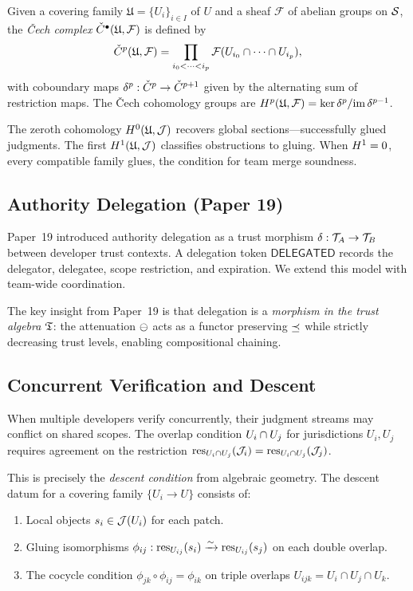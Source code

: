 \documentclass[11pt]{article}
\newcommand{\DelegToken}{\mathsf{DELEGATED}}
\begin{document}
\begin{definition}
Given a covering family $\mathfrak{U} = \{U_i\}_{i \in I}$ of $U$ and a sheaf
$\mathcal{F}$ of abelian groups on $\mathcal{S}$, the \emph{\v{C}ech complex}
$\check{C}^\bullet(\mathfrak{U}, \mathcal{F})$ is defined by
\[
  \check{C}^p(\mathfrak{U}, \mathcal{F}) =
  \prod_{i_0 < \cdots < i_p} \mathcal{F}(U_{i_0} \cap \cdots \cap U_{i_p}),
\]
with coboundary maps $\delta^p : \check{C}^p \to \check{C}^{p+1}$ given by the
alternating sum of restriction maps. The \v{C}ech cohomology groups are
$H^{p}(\mathfrak{U}, \mathcal{F}) = \ker \delta^p / \mathrm{im}\,\delta^{p-1}$.
\end{definition}

The zeroth cohomology $H^{0}(\mathfrak{U}, \mathcal{J})$ recovers global
sections---successfully glued judgments. The first $H^{1}(\mathfrak{U}, \mathcal{J})$
classifies obstructions to gluing. When $H^{1} = 0$, every compatible
family glues, the condition for team merge soundness.

\subsection{Authority Delegation (Paper 19)}

Paper~19 introduced authority delegation as a trust morphism
$\delta : \mathcal{T}_A \to \mathcal{T}_B$ between developer trust contexts. A delegation
token $\DelegToken$ records the delegator, delegatee, scope restriction, and
expiration. We extend this model with team-wide coordination.

The key insight from Paper~19 is that delegation is a \emph{morphism in the
trust algebra} $\mathfrak{T}$: the attenuation $\ominus$ acts as a functor preserving
$\preceq$ while strictly decreasing trust levels, enabling compositional chaining.

\subsection{Concurrent Verification and Descent}

When multiple developers verify concurrently, their judgment streams may
conflict on shared scopes. The overlap condition
$U_i \cap U_j$ for jurisdictions $U_i, U_j$ requires agreement on the
restriction $\mathrm{res}_{U_i \cap U_j}(\mathcal{J}_i) = \mathrm{res}_{U_i \cap U_j}(\mathcal{J}_j)$.

This is precisely the \emph{descent condition} from algebraic geometry.
The descent datum for a covering family $\{U_i \to U\}$ consists of:
\begin{enumerate}
  \item Local objects $s_i \in \mathcal{J}(U_i)$ for each patch.
  \item Gluing isomorphisms $\phi_{ij} : \mathrm{res}_{U_{ij}}(s_i) \xrightarrow{\sim}
        \mathrm{res}_{U_{ij}}(s_j)$ on each double overlap.
  \item The cocycle condition $\phi_{jk} \circ \phi_{ij} = \phi_{ik}$ on triple
        overlaps $U_{ijk} = U_i \cap U_j \cap U_k$.
\end{enumerate}
\end{document}
